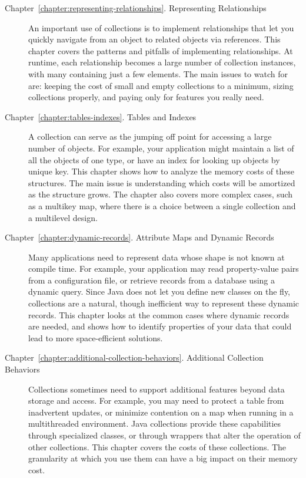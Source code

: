 \begin{description}
\item[Chapter~\ref{chapter:representing-relationships}. Representing
Relationships] An important use of collections is to implement
relationships that let you quickly navigate from an object to related objects
via references. This chapter covers the patterns and pitfalls of
implementing relationships. At runtime, each relationship becomes a
large number of collection instances, with many containing just a few elements.
The main issues to watch for
are: keeping the cost of small and empty collections to a minimum, sizing
collections properly, and paying only for features you really need.

\item[Chapter~\ref{chapter:tables-indexes}. Tables and Indexes] A collection
can serve as the jumping off
point for accessing a large number of objects. For example, your application
might maintain a list of all the objects of one type, or have an index for
looking up objects by unique key. This chapter shows how to analyze the memory
costs of these structures. The main
issue is understanding which costs will be amortized as the structure grows. The
chapter also covers more complex cases, such as a multikey map, where there is a
choice between a single collection and a multilevel design.

\item[Chapter~\ref{chapter:dynamic-records}. Attribute Maps and Dynamic
Records] Many applications need to represent data whose shape is not
known at compile time. For example, your application may read property-value
pairs from a configuration file, or retrieve records from a database
using a dynamic query. Since Java does not let you define new classes on the
fly, collections are a natural, though inefficient way to represent
these dynamic records. This chapter looks at the common cases where dynamic records
are needed, and shows how to identify properties of your data that could lead to
more space-efficient solutions.

\item[Chapter~\ref{chapter:additional-collection-behaviors}. Additional
Collection Behaviors] Collections sometimes need to support additional features
beyond data storage and access. For example,
you may need to protect a table from inadvertent
updates, or minimize contention on a map when running in a
multithreaded environment. Java collections provide these capabilities through
specialized classes, or through wrappers that alter
the operation of other collections. This chapter covers the costs of
these collections.  The granularity
at which you use them can have a big impact on their memory
cost.

\end{description}

